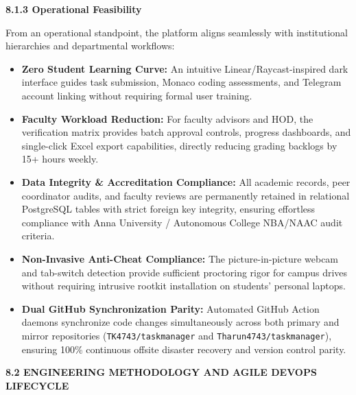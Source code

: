 {\vspace{0.4cm}
{\fontsize{13pt}{17pt}\selectfont\bfseries 8.1.3 Operational Feasibility\par}
\vspace{0.2cm}

From an operational standpoint, the platform aligns seamlessly with institutional hierarchies and departmental workflows:
\begin{itemize}[noitemsep,topsep=2pt,leftmargin=*]
  \item \textbf{Zero Student Learning Curve:} An intuitive Linear/Raycast-inspired dark interface guides task submission, Monaco coding assessments, and Telegram account linking without requiring formal user training.
  \item \textbf{Faculty Workload Reduction:} For faculty advisors and HOD, the verification matrix provides batch approval controls, progress dashboards, and single-click Excel export capabilities, directly reducing grading backlogs by 15+ hours weekly.
  \item \textbf{Data Integrity \& Accreditation Compliance:} All academic records, peer coordinator audits, and faculty reviews are permanently retained in relational PostgreSQL tables with strict foreign key integrity, ensuring effortless compliance with Anna University / Autonomous College NBA/NAAC audit criteria.
  \item \textbf{Non-Invasive Anti-Cheat Compliance:} The picture-in-picture webcam and tab-switch detection provide sufficient proctoring rigor for campus drives without requiring intrusive rootkit installation on students' personal laptops.
  \item \textbf{Dual GitHub Synchronization Parity:} Automated GitHub Action daemons synchronize code changes simultaneously across both primary and mirror repositories (\texttt{TK4743/}\allowbreak\texttt{taskmanager} and \texttt{Tharun4743/}\allowbreak\texttt{taskmanager}), ensuring 100\% continuous offsite disaster recovery and version control parity.
\end{itemize}

\vspace{0.4cm}
{\fontsize{14pt}{18pt}\selectfont\bfseries 8.2 ENGINEERING METHODOLOGY AND AGILE DEVOPS LIFECYCLE\par}
\vspace{0.3cm}

}
